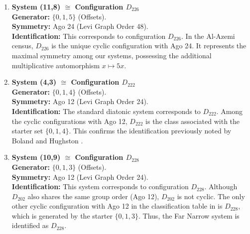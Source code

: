 \documentclass[12pt,letterpaper]{amsart}
\begin{document}
\begin{enumerate}
    \item \textbf{System (11,8) $\cong$ Configuration $D_{226}$} \\
    \textbf{Generator:} $\{0, 1, 5\}$ (Offsets). \\
    \textbf{Symmetry:} Ago 24 (Levi Graph Order 48). \\
    \textbf{Identification:} This corresponds to configuration $D_{226}$. In the Al-Azemi census, $D_{226}$ is the unique cyclic configuration with Ago 24. It represents the maximal symmetry among our systems, possessing the additional multiplicative automorphism $x \mapsto 5x$.

    \item \textbf{System (4,3) $\cong$ Configuration $D_{222}$} \\
    \textbf{Generator:} $\{0, 1, 4\}$ (Offsets). \\
    \textbf{Symmetry:} Ago 12 (Levi Graph Order 24). \\
    \textbf{Identification:} The standard diatonic system corresponds to $D_{222}$. Among the cyclic configurations with Ago 12, $D_{222}$ is the class associated with the starter set $\{0, 1, 4\}$. This confirms the identification previously noted by Boland and Hughston \cite{lane}.

    \item \textbf{System (10,9) $\cong$ Configuration $D_{228}$} \\
    \textbf{Generator:} $\{0, 1, 3\}$ (Offsets). \\
    \textbf{Symmetry:} Ago 12 (Levi Graph Order 24). \\
    \textbf{Identification:} This system corresponds to configuration $D_{228}$. Although $D_{202}$ also shares the same group order (Ago 12), $D_{202}$ is not cyclic. The only other cyclic configuration with Ago 12 in the classification table in \cite{AlAzemi2014} is $D_{228}$, which is generated by the starter $\{0, 1, 3\}$. Thus, the Far Narrow system is identified as $D_{228}$.
\end{enumerate}
\end{document}
